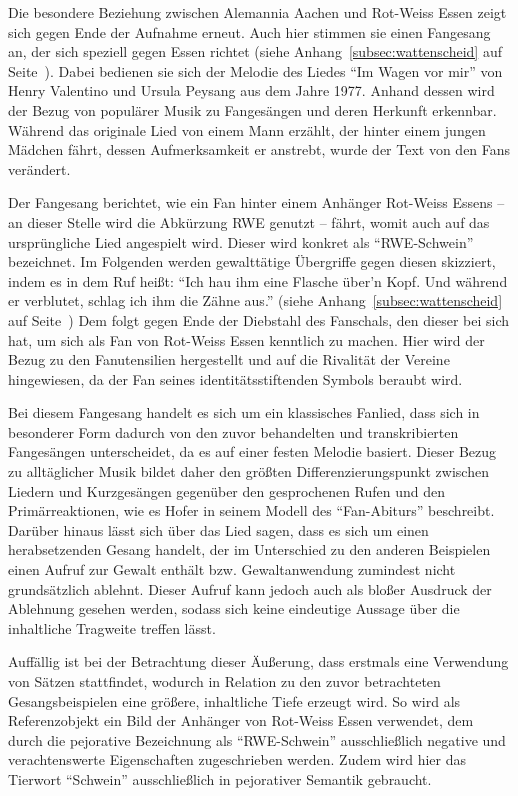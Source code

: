 Die besondere Beziehung zwischen Alemannia Aachen und Rot-Weiss Essen zeigt sich gegen Ende der Aufnahme erneut.
Auch hier stimmen sie einen Fangesang an, der sich speziell gegen Essen richtet (siehe Anhang~\ref{subsec:wattenscheid} auf Seite~\pageref{subsec:wattenscheid}).
Dabei bedienen sie sich der Melodie des Liedes "`Im Wagen vor mir"' von Henry Valentino und Ursula Peysang aus dem Jahre 1977.
Anhand dessen wird der Bezug von populärer Musik zu Fangesängen und deren Herkunft erkennbar.
Während das originale Lied von einem Mann erzählt, der hinter einem jungen Mädchen fährt, dessen Aufmerksamkeit er anstrebt, wurde der Text von den Fans verändert.

Der Fangesang berichtet, wie ein Fan hinter einem Anhänger Rot-Weiss Essens – an dieser Stelle wird die Abkürzung RWE genutzt – fährt, womit auch auf das ursprüngliche Lied angespielt wird.
Dieser wird konkret als "`RWE-Schwein"' bezeichnet.
Im Folgenden werden gewalttätige Übergriffe gegen diesen skizziert, indem es in dem Ruf heißt:
"`Ich hau ihm eine Flasche über'n Kopf.
Und während er verblutet, schlag ich ihm die Zähne aus."' (siehe Anhang~\ref{subsec:wattenscheid} auf Seite~\pageref{subsec:wattenscheid})
Dem folgt gegen Ende der Diebstahl des Fanschals, den dieser bei sich hat, um sich als Fan von Rot-Weiss Essen kenntlich zu machen.
Hier wird der Bezug zu den Fanutensilien hergestellt und auf die Rivalität der Vereine hingewiesen, da der Fan seines identitätsstiftenden Symbols beraubt wird.

Bei diesem Fangesang handelt es sich um ein klassisches Fanlied, dass sich in besonderer Form dadurch von den zuvor behandelten und transkribierten Fangesängen unterscheidet, da es auf einer festen Melodie basiert.
Dieser Bezug zu alltäglicher Musik bildet daher den größten Differenzierungspunkt zwischen Liedern und Kurzgesängen gegenüber den gesprochenen Rufen und den Primärreaktionen, wie es Hofer in seinem Modell des "`Fan-Abiturs"' beschreibt\cite[S. 15]{RK98}.
Darüber hinaus lässt sich über das Lied sagen, dass es sich um einen herabsetzenden Gesang handelt, der im Unterschied zu den anderen Beispielen einen Aufruf zur Gewalt enthält bzw. Gewaltanwendung zumindest nicht grundsätzlich ablehnt.
Dieser Aufruf kann jedoch auch als bloßer Ausdruck der Ablehnung gesehen werden, sodass sich keine eindeutige Aussage über die inhaltliche Tragweite treffen lässt.

Auffällig ist bei der Betrachtung dieser Äußerung, dass erstmals eine Verwendung von Sätzen stattfindet, wodurch in Relation zu den zuvor betrachteten Gesangsbeispielen eine größere, inhaltliche Tiefe erzeugt wird.
So wird als Referenzobjekt ein Bild der Anhänger von Rot-Weiss Essen verwendet, dem durch die pejorative Bezeichnung als "`RWE-Schwein"' ausschließlich negative und verachtenswerte Eigenschaften zugeschrieben werden\cite{Dud15}.
Zudem wird hier das Tierwort "`Schwein"' ausschließlich in pejorativer Semantik gebraucht.

